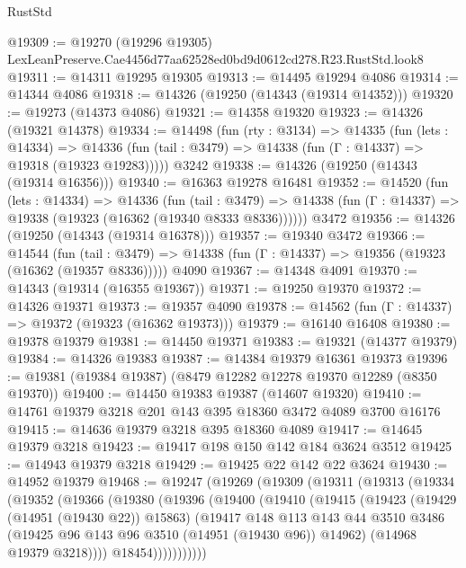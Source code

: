 \begin{lexlean}{RustStd}
\begin{coremodule}
@19309 := @19270 (@19296 @19305) LexLeanPreserve.Cae4456d77aa62528ed0bd9d0612cd278.R23.RustStd.look8
@19311 := @14311 @19295 @19305
@19313 := @14495 @19294 @4086
@19314 := @14344 @4086
@19318 := @14326 (@19250 (@14343 (@19314 @14352)))
@19320 := @19273 (@14373 @4086)
@19321 := @14358 @19320
@19323 := @14326 (@19321 @14378)
@19334 := @14498
    (fun (rty : @3134) =>
    @14335
      (fun (lets : @14334) =>
      @14336 (fun (tail : @3479) => @14338 (fun (Γ : @14337) => @19318 (@19323 @19283)))))
    @3242
@19338 := @14326 (@19250 (@14343 (@19314 @16356)))
@19340 := @16363 @19278 @16481
@19352 := @14520
    (fun (lets : @14334) =>
    @14336
      (fun (tail : @3479) =>
      @14338 (fun (Γ : @14337) => @19338 (@19323 (@16362 (@19340 @8333 @8336))))))
    @3472
@19356 := @14326 (@19250 (@14343 (@19314 @16378)))
@19357 := @19340 @3472
@19366 := @14544
    (fun (tail : @3479) => @14338 (fun (Γ : @14337) => @19356 (@19323 (@16362 (@19357 @8336)))))
    @4090
@19367 := @14348 @4091
@19370 := @14343 (@19314 (@16355 @19367))
@19371 := @19250 @19370
@19372 := @14326 @19371
@19373 := @19357 @4090
@19378 := @14562 (fun (Γ : @14337) => @19372 (@19323 (@16362 @19373)))
@19379 := @16140 @16408
@19380 := @19378 @19379
@19381 := @14450 @19371
@19383 := @19321 (@14377 @19379)
@19384 := @14326 @19383
@19387 := @14384 @19379 @16361 @19373
@19396 := @19381 (@19384 @19387) (@8479 @12282 @12278 @19370 @12289 (@8350 @19370))
@19400 := @14450 @19383 @19387 (@14607 @19320)
@19410 := @14761 @19379 @3218 @201 @143 @395 @18360 @3472 @4089 @3700 @16176
@19415 := @14636 @19379 @3218 @395 @18360 @4089
@19417 := @14645 @19379 @3218
@19423 := @19417 @198 @150 @142 @184 @3624 @3512
@19425 := @14943 @19379 @3218
@19429 := @19425 @22 @142 @22 @3624
@19430 := @14952 @19379
@19468 := @19247
    (@19269
      (@19309
        (@19311
          (@19313
            (@19334
              (@19352
                (@19366
                  (@19380
                    (@19396
                      (@19400
                        (@19410
                          (@19415
                            (@19423
                              (@19429 (@14951 (@19430 @22)) @15863)
                              (@19417
                                @148
                                @113
                                @143
                                @44
                                @3510
                                @3486
                                (@19425 @96 @143 @96 @3510 (@14951 (@19430 @96)) @14962)
                                (@14968 @19379 @3218))))
                          @18454)))))))))))

\end{coremodule}
\end{lexlean}
